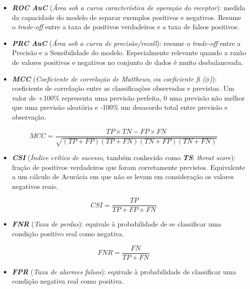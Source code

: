 \documentclass[]{article}
\begin{document}
\begin{itemize}
\item
  \textbf{\emph{ROC AuC}} (\emph{Área sob a curva característica de
  operação do receptor}): medida da capacidade do modelo de separar
  exemplos positivos e negativos. Resume o \emph{trade-off} entre a taxa
  de positivos verdadeiros e a taxa de falsos positivos.
\item
  \textbf{\emph{PRC AuC}} (\emph{Área sob a curva de precisão/recall}):
  resume o \emph{trade-off} entre a Precisão e a Sensibilidade do
  modelo. Especialmente relevante quando a razão de valores positivos e
  negativos no conjunto de dados é muito desbalanceada.
\item
  \textbf{\emph{MCC}} (\emph{Coeficiente de correlação de Matthews}, ou
  \emph{coeficiente fi (\(\phi\))}): coeficiente de correlação entre as
  classificações observadas e previstas. Um valor de +100\% representa
  uma previsão perfeita, 0 uma previsão não melhor que uma previsão
  aleatória e -100\% um desacordo total entre previsão e observação. 
\end{itemize}

\[MCC = \frac{TP \times TN - FP \times FN}{\sqrt{(TP + FP)(TP + FN)(TN + FP)(TN + FN)}}\]

\begin{itemize}
\item
  \textbf{\emph{CSI}} (\emph{Índice crítico de sucesso}, também
  conhecido como \textbf{\emph{TS}}: \emph{threat score}): fração de
  positivos verdadeiros que foram corretamente previstos. Equivalente a
  um cálculo de Acurácia em que não se levam em consideração os valores
  negativos reais.
\end{itemize}

\[CSI = \frac{TP}{TP + FP + FN}\]

\begin{itemize}
\item
  \textbf{\emph{FNR}} (\emph{Taxa de perdas}): equivale à probabilidade
  de se classificar uma condição positivo real como negativa.
\end{itemize}

\[FNR = \frac{FN}{TP + FN}\]

\begin{itemize}
\item
  \textbf{\emph{FPR}} (\emph{Taxa de alarmes falsos}): equivale à
  probabilidade de classificar uma condição negativa real como positiva.
\end{itemize}
\end{document}
